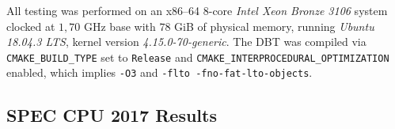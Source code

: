 All testing was performed on an x86--64 8-core \textit{Intel Xeon Bronze 3106} system clocked at $1,70$ GHz base with $78$ GiB of physical memory, running \textit{Ubuntu 18.04.3 LTS}, kernel version \textit{4.15.0-70-generic}.
The DBT was compiled via \texttt{CMAKE\_BUILD\_TYPE} set to \texttt{Release} and \texttt{CMAKE\_INTERPROCEDURAL\_OPTIMIZATION} enabled, which implies \texttt{-O3} and \texttt{-flto -fno-fat-lto-objects}.

\subsection{SPEC CPU 2017 Results}


\nativetable
{}\dbttable
{}\dbttable
{}\dbttable

\pgfplotstablesort[sort key = ratio, sort cmp=float >]\sorteddbttable{\dbttable}

